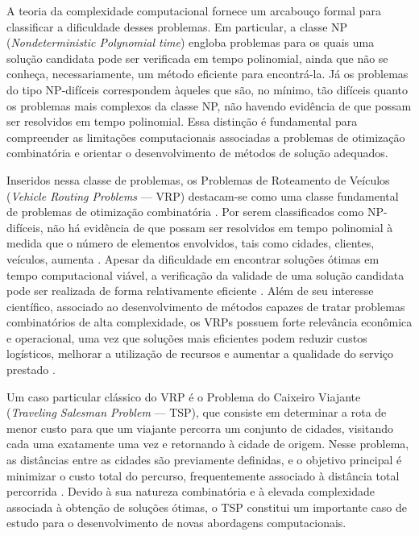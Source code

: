 A teoria da complexidade computacional fornece um arcabouço formal para classificar a dificuldade desses problemas. Em particular, a classe NP (\textit{Nondeterministic Polynomial time}) engloba problemas para os quais uma solução candidata pode ser verificada em tempo polinomial, ainda que não se conheça, necessariamente, um método eficiente para encontrá-la. Já os problemas do tipo NP-difíceis correspondem àqueles que são, no mínimo, tão difíceis quanto os problemas mais complexos da classe NP, não havendo evidência de que possam ser resolvidos em tempo polinomial. Essa distinção é fundamental para compreender as limitações computacionais associadas a problemas de otimização combinatória e orientar o desenvolvimento de métodos de solução adequados.

Inseridos nessa classe de problemas, os Problemas de Roteamento de Veículos (\textit{Vehicle Routing Problems} — VRP) destacam-se como uma classe fundamental de problemas de otimização combinatória \cite{psaraftis1995dynamic, laporte1992vehicle}. Por serem classificados como NP-difíceis, não há evidência de que possam ser resolvidos em tempo polinomial à medida que o número de elementos envolvidos, tais como cidades, clientes, veículos, aumenta \cite{karp2009reducibility}. Apesar da dificuldade em encontrar soluções ótimas em tempo computacional viável, a verificação da validade de uma solução candidata pode ser realizada de forma relativamente eficiente \cite{sipser1996introduction, lenstra1981complexity}. Além de seu interesse científico, associado ao desenvolvimento de métodos capazes de tratar problemas combinatórios de alta complexidade, os VRPs possuem forte relevância econômica e operacional, uma vez que soluções mais eficientes podem reduzir custos logísticos, melhorar a utilização de recursos e aumentar a qualidade do serviço prestado \cite{dantzig1959truck,toth2002vehicle}. 

Um caso particular clássico do VRP é o Problema do Caixeiro Viajante (\textit{Traveling Salesman Problem} — TSP), que consiste em determinar a rota de menor custo para que um viajante percorra um conjunto de cidades, visitando cada uma exatamente uma vez e retornando à cidade de origem. Nesse problema, as distâncias entre as cidades são previamente definidas, e o objetivo principal é minimizar o custo total do percurso, frequentemente associado à distância total percorrida \cite{dantzig1954solution, applegate2011traveling}. Devido à sua natureza combinatória e à elevada complexidade associada à obtenção de soluções ótimas, o TSP constitui um importante caso de estudo para o desenvolvimento de novas abordagens computacionais.

